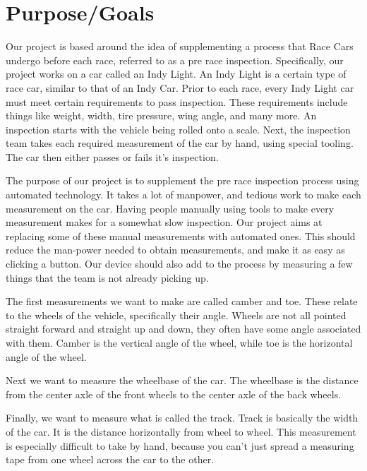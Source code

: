 \documentclass[onecolumn, draftclsnofoot,10pt, compsoc]{IEEEtran}
\begin{document}
\section{Purpose/Goals}
Our project is based around the idea of supplementing a process that Race Cars undergo before each race, referred to as a pre race inspection.  Specifically, our project works on a car called an Indy Light.  An Indy Light is a certain type of race car, similar to that of an Indy Car.  Prior to each race, every Indy Light car must meet certain requirements to pass inspection.  These requirements include things like weight, width, tire pressure, wing angle, and many more.  An inspection starts with the vehicle being rolled onto a scale.  Next, the inspection team takes each required measurement of the car by hand, using special tooling.  The car then either passes or fails it’s inspection.
\newline

\noindent The purpose of our project is to supplement the pre race inspection process using automated technology.  It takes a lot of manpower, and tedious work to make each measurement on the car.  Having people manually using tools to make every measurement makes for a somewhat slow inspection.  Our project aims at replacing some of these manual measurements with automated ones.  This should reduce the man-power needed to obtain measurements, and make it as easy as clicking a button.  Our device should also add to the process by measuring a few things that the team is not already picking up.

\newline

\noindent The first measurements we want to make are called camber and toe.  These relate to the wheels of the vehicle, specifically their angle.  Wheels are not all pointed straight forward and straight up and down, they often have some angle associated with them. Camber is the vertical angle of the wheel, while toe is the horizontal angle of the wheel.
\newline

\noindent Next we want to measure the wheelbase of the car.  The wheelbase is the distance from the center axle of the front wheels to the center axle of the back wheels.

\newline

\noindent Finally,  we want to measure what is called the track.  Track is basically the width of the car.  It is the distance horizontally from wheel to wheel.  This measurement is especially difficult to take by hand, because you can't just spread a measuring tape from one wheel across the car to the other.
\newline
\end{document}
